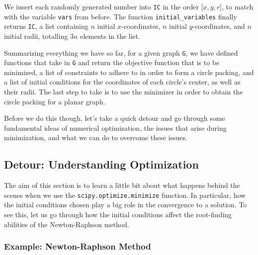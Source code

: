 \begin{flushleft}
We insert each randomly generated number into \texttt{IC} in the order [$x,y,r$], to match with the variable \texttt{vars} from before. The function \texttt{initial\_variables} finally returns \texttt{IC}, a list containing $n$ initial $x$-coordinates, $n$ initial $y$-coordinates, and $n$ initial radii, totalling $3n$ elements in the list.
\end{flushleft}

\begin{flushleft}
Summarizing everything we have so far, for a given graph \texttt{G}, we have defined functions that take in \texttt{G} and return the objective function that is to be minimized, a list of constraints to adhere to in order to form a circle packing, and a list of initial conditions for the coordinates of each circle's center, as well as their radii. The last step to take is to use the minimizer in order to obtain the circle packing for a planar graph.
\end{flushleft}

\begin{flushleft}
Before we do this though, let's take a quick detour and go through some fundamental ideas of numerical optimization, the issues that arise during minimization, and what we can do to overcome these issues. 
\end{flushleft}

\subsection{Detour: Understanding Optimization}

\begin{flushleft}
The aim of this section is to learn a little bit about what happens behind the scenes when we use the \texttt{scipy.optimize.minimize} function. In particular, how the initial conditions chosen play a big role in the convergence to a solution. To see this, let us go through how the initial conditions affect the root-finding abilities of the Newton-Raphson method.
\end{flushleft}

\subsubsection{Example: Newton-Raphson Method}

